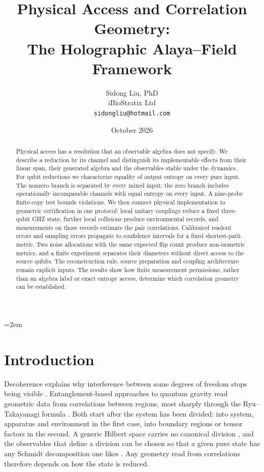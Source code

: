 \documentclass[12pt,a4paper]{article}
\title{Physical Access and Correlation Geometry:\\
The Holographic Alaya--Field Framework}
\author{
  Sidong Liu, PhD \\[0.6ex]
  iBioStratix Ltd \\[0.8ex]
  \texttt{sidongliu@hotmail.com}
}
\date{October 2026}
\begin{document}
\emergencystretch=2em
\raggedbottom
{}

\maketitle

\begin{abstract}
Physical access has a resolution that an observable algebra does not specify. We describe a reduction by its channel and distinguish its implementable effects from their linear span, their generated algebra and the observables stable under the dynamics. For qubit reductions we characterize equality of output entropy on every pure input. The nonzero branch is separated by every mixed input; the zero branch includes operationally incomparable channels with equal entropy on every input. A nine-probe finite-copy test bounds violations. We then connect physical implementation to geometric certification in one protocol: local unitary couplings reduce a fixed three-qubit GHZ state, further local collisions produce environmental records, and measurements on those records estimate the pair correlations. Calibrated readout errors and sampling errors propagate to confidence intervals for a fixed shortest-path metric. Two noise allocations with the same expected flip count produce non-isometric metrics, and a finite experiment separates their diameters without direct access to the source qubits. The reconstruction rule, source preparation and coupling architecture remain explicit inputs. The results show how finite measurement permissions, rather than an algebra label or exact entropy access, determine which correlation geometry can be established.
\end{abstract}

\section{Introduction}
\label{sec:intro}

Decoherence explains why interference between some degrees of freedom stops being visible \cite{Zurek2003}. Entanglement-based approaches to quantum gravity read geometric data from correlations between regions, most sharply through the Ryu--Takayanagi formula \cite{Maldacena1999,RyuTakayanagi2006,VanRaamsdonk2010}. Both start after the system has been divided: into system, apparatus and environment in the first case, into boundary regions or tensor factors in the second. A generic Hilbert space carries no canonical division \cite{Zanardi2001,Zanardi2004,Viola2004}, and the observables that define a division can be chosen so that a given pure state has any Schmidt decomposition one likes \cite{HarshmanRanade2011}. Any geometry read from correlations therefore depends on how the state is reduced.
\end{document}
